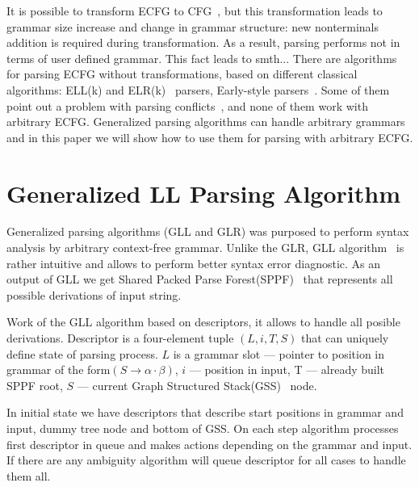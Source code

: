 \documentclass[runningheads,a4paper]{llncs}
\begin{document}
It is possible to transform ECFG to CFG~\cite{ELL}, but this transformation leads to grammar size 
increase and change in grammar structure: new nonterminals addition is required during transformation.
As a result, parsing performs not in terms of user defined grammar.
This fact leads to smth... 
There are algorithms for parsing ECFG without transformations, based on different classical algorithms: 
ELL(k) and ELR(k)~\cite{ELL} parsers, Early-style parsers~\cite{!!!}.
Some of them point out a problem with parsing conflicts~\cite{}, and none of them work with arbitrary ECFG.
Generalized parsing algorithms can handle arbitrary grammars and in this paper we
will show how to use them for parsing with arbitrary ECFG.




\section{Generalized LL Parsing Algorithm}%

Generalized parsing algorithms (GLL and GLR) was purposed to perform syntax analysis by arbitrary context-free 
grammar. Unlike the GLR, GLL algorithm~\cite{scott2010gll} is rather intuitive and allows to perform better syntax error diagnostic.
As an output of GLL we get Shared Packed Parse Forest(SPPF)~\cite{scott2013gll} that represents all possible derivations of input string.

Work of the GLL algorithm based on descriptors, it allows to handle all posible derivations.
Descriptor is a four-element tuple $(L,i, T, S)$ that can uniquely define state of parsing process. 
$L$ is a grammar slot --- pointer to position in grammar of the form$(S \to \alpha \cdot \beta)$, $i$ --- position in input,
T --- already built SPPF root, $S$ --- current Graph Structured Stack(GSS)~\cite{GSS} node.

In initial state we have descriptors that describe start positions in grammar and input, dummy tree node and bottom of GSS.
On each step algorithm processes first descriptor in queue and makes actions depending on the grammar and input.
If there are any ambiguity algorithm will queue descriptor for all cases to handle them all. 
\end{document}
